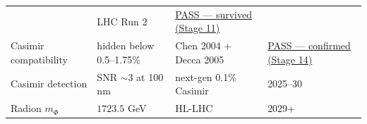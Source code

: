 \documentclass[
  11pt,
]{article}
\begin{document}
\begin{longtable}[]{@{}llll@{}}
\begin{minipage}[t]{0.22\columnwidth}
\end{minipage} & \begin{minipage}[t]{0.22\columnwidth}\raggedright
LHC Run 2\strut
\end{minipage} & \begin{minipage}[t]{0.22\columnwidth}\raggedright
\protect\hyperlink{311-stage-11--bootstrap-proof-mux3c6--bux2080-v_ew}{PASS
--- survived (Stage 11)}\strut
\end{minipage}\tabularnewline
\begin{minipage}[t]{0.22\columnwidth}\raggedright
Casimir compatibility\strut
\end{minipage} & \begin{minipage}[t]{0.22\columnwidth}\raggedright
hidden below 0.5--1.75\%\strut
\end{minipage} & \begin{minipage}[t]{0.22\columnwidth}\raggedright
Chen 2004 + Decca 2005\strut
\end{minipage} & \begin{minipage}[t]{0.22\columnwidth}\raggedright
\protect\hyperlink{314-stage-14--casimir-prediction-vs-experiment}{PASS
--- confirmed (Stage 14)}\strut
\end{minipage}\tabularnewline
\begin{minipage}[t]{0.22\columnwidth}\raggedright
Casimir detection\strut
\end{minipage} & \begin{minipage}[t]{0.22\columnwidth}\raggedright
SNR \(\sim 3\) at 100 nm\strut
\end{minipage} & \begin{minipage}[t]{0.22\columnwidth}\raggedright
next-gen 0.1\% Casimir\strut
\end{minipage} & \begin{minipage}[t]{0.22\columnwidth}\raggedright
2025--30\strut
\end{minipage}\tabularnewline
\begin{minipage}[t]{0.22\columnwidth}\raggedright
Radion \(m_\Phi\)\strut
\end{minipage} & \begin{minipage}[t]{0.22\columnwidth}\raggedright
\(1723.5\) GeV\strut
\end{minipage} & \begin{minipage}[t]{0.22\columnwidth}\raggedright
HL-LHC\strut
\end{minipage} & \begin{minipage}[t]{0.22\columnwidth}\raggedright
2029+\strut
\end{minipage}\tabularnewline

\end{longtable}
\end{document}
